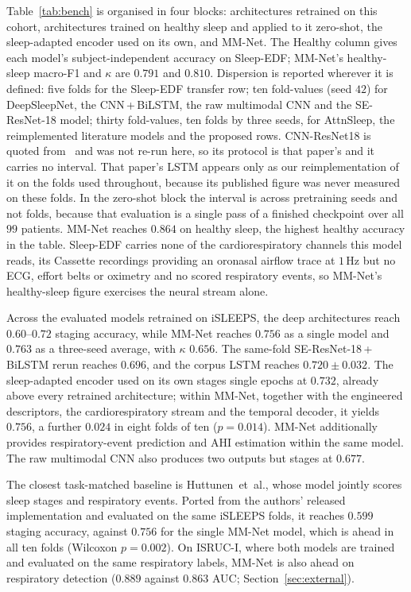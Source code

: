 \documentclass{ieeeaccess}
\newcommand{\mmAcc}{0.763}
\newcommand{\mmAccS}{0.756}
\newcommand{\mmK}{0.656}
\begin{document}
Table~\ref{tab:bench} is organised in four blocks: architectures retrained on this
cohort, architectures trained on healthy sleep and applied to it zero-shot, the
sleep-adapted encoder used on its own, and MM-Net. The Healthy column gives each model's
subject-independent accuracy on Sleep-EDF; MM-Net's healthy-sleep macro-F1 and $\kappa$ are
$0.791$ and $0.810$.
Dispersion is reported wherever it is defined: five folds for the Sleep-EDF transfer row;
ten fold-values (seed $42$) for DeepSleepNet, the CNN\,+\,BiLSTM, the raw multimodal CNN and
the SE-ResNet-18 model; thirty fold-values, ten folds by three seeds, for AttnSleep, the
reimplemented literature models and the proposed rows. CNN-ResNet18 is quoted
from~\cite{bose2026gap} and was not re-run here, so its protocol is that paper's and it
carries no interval. That paper's LSTM appears only as our reimplementation of it on the
folds used throughout, because its published figure was never measured on these folds. In the zero-shot block the interval is across
pretraining seeds and not folds, because that evaluation is a single pass of a finished
checkpoint over all $99$ patients. MM-Net reaches $0.864$ on healthy sleep, the highest
healthy accuracy in the table. Sleep-EDF carries none of the cardiorespiratory
channels this model reads, its Cassette recordings providing an oronasal airflow trace at
$1$\,Hz but no ECG, effort belts or oximetry and no scored respiratory events, so MM-Net's
healthy-sleep figure exercises the neural stream alone.

Across the evaluated models retrained on iSLEEPS, the deep architectures reach
$0.60$--$0.72$ staging accuracy, while MM-Net reaches $\mmAccS$ as a single model and
$\mmAcc$ as a three-seed average, with $\kappa$ $\mmK$. The same-fold
SE-ResNet-18\,+\,BiLSTM rerun reaches $0.696$, and the corpus LSTM reaches
$0.720 \pm 0.032$. The sleep-adapted encoder used on its own stages single epochs at
$0.732$, already above every retrained architecture; within MM-Net, together with the
engineered descriptors, the cardiorespiratory stream and the temporal decoder, it yields
$\mmAccS$, a further $0.024$ in eight folds of ten ($p=0.014$). MM-Net additionally provides
respiratory-event prediction and AHI estimation within the same model. The raw multimodal
CNN also produces two outputs but stages at $0.677$.

The closest task-matched baseline is Huttunen~et~al., whose model jointly scores
sleep stages and respiratory events. Ported from the authors' released implementation
and evaluated on the same iSLEEPS folds, it reaches $0.599$ staging accuracy, against
$\mmAccS$ for the single MM-Net model, which is ahead in all ten folds (Wilcoxon $p=0.002$).
On ISRUC-I, where both models are trained and evaluated on the same respiratory labels,
MM-Net is also ahead on respiratory detection ($0.889$ against $0.863$ AUC;
Section~\ref{sec:external}).
\end{document}

